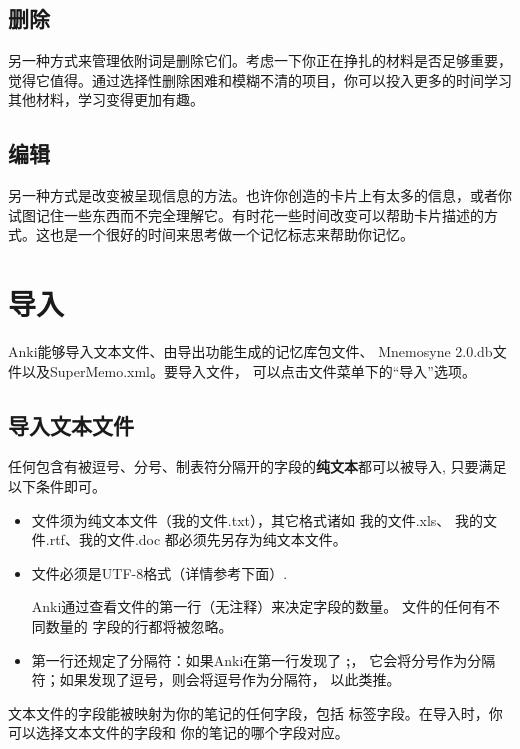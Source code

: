 \documentclass[a4paper]{book}
\begin{document}
		\section{删除}
		
		另一种方式来管理依附词是删除它们。考虑一下你正在挣扎的材料是否足够重要，觉得它值得。通过选择性删除困难和模糊不清的项目，你可以投入更多的时间学习其他材料，学习变得更加有趣。
		
		\section{编辑}\label{editor}
		
		另一种方式是改变被呈现信息的方法。也许你创造的卡片上有太多的信息，或者你试图记住一些东西而不完全理解它。有时花一些时间改变可以帮助卡片描述的方式。这也是一个很好的时间来思考做一个记忆标志来帮助你记忆。
		
		\chapter{导入}\label{importing}
		
		Anki能够导入文本文件、由导出功能生成的记忆库包文件、 Mnemosyne 2.0.db文件以及SuperMemo.xml。要导入文件， 可以点击文件菜单下的“导入”选项。
		
		\section{导入文本文件}
		
		任何包含有被逗号、分号、制表符分隔开的字段的\textbf{纯文本}都可以被导入, 只要满足以下条件即可。
		
		\begin{itemize}
			\itemsep1pt\parskip0pt
			\item 文件须为纯文本文件（我的文件.txt），其它格式诸如 我的文件.xls、 我的文件.rtf、我的文件.doc 都必须先另存为纯文本文件。
			\item 文件必须是UTF-8格式（详情参考下面）.
			
			Anki通过查看文件的第一行（无注释）来决定字段的数量。 文件的任何有不同数量的 字段的行都将被忽略。
			\item 第一行还规定了分隔符：如果Anki在第一行发现了 \textbf{;}， 它会将分号作为分隔符；如果发现了逗号，则会将逗号作为分隔符， 以此类推。
		\end{itemize}
		
		文本文件的字段能被映射为你的笔记的任何字段，包括 标签字段。在导入时，你可以选择文本文件的字段和 你的笔记的哪个字段对应。
		
\end{document}
